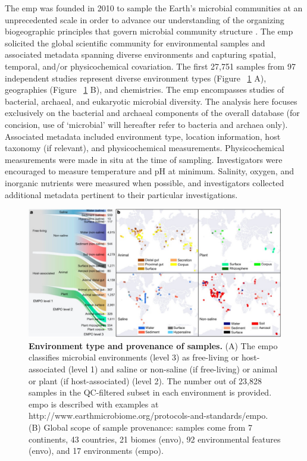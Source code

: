 The \gls{emp} was founded in 2010 to sample the Earth's microbial communities at an
unprecedented scale in order to advance our understanding of the organizing
biogeographic principles that govern microbial community structure
\cite{Gilbert2010, Gilbert2014}. The \gls{emp} solicited the global scientific
community for environmental samples and associated metadata spanning diverse
environments and capturing spatial, temporal, and/or physicochemical covariation.
The first 27,751 samples from 97 independent studies represent diverse environment
types (Figure ~\ref{EMProvenance} A), geographies (Figure ~\ref{EMProvenance} B),
and chemistries. The \gls{emp} encompasses studies of bacterial, archaeal, and
eukaryotic microbial diversity. The analysis here focuses exclusively on the
bacterial and archaeal components of the overall database (for concision, use of
‘microbial’ will hereafter refer to bacteria and archaea only). Associated metadata
included environment type, location information, host taxonomy (if relevant), and
physicochemical measurements. Physicochemical measurements were made in situ at
the time of sampling. Investigators were encouraged to measure temperature and
pH at minimum. Salinity, oxygen, and inorganic nutrients were measured when possible,
and investigators collected additional metadata pertinent to their particular investigations.

\begin{figure}[htbp]
\includegraphics[width=\columnwidth]{chapter_contributions_figures/EMProvenance.pdf}
\caption[Environment type and provenance of samples]{\textbf{Environment type and provenance of samples.}
(A) The \gls{empo} classifies microbial environments (level 3) as free-living or
host-associated (level 1) and saline or non-saline (if free-living) or animal
or plant (if host-associated) (level 2). The number out of 23,828 samples in the
QC-filtered subset in each environment is provided. \gls{empo} is described with examples
at http://www.earthmicrobiome.org/protocols-and-standards/empo. (B) Global scope of
sample provenance: samples come from 7 continents, 43 countries, 21 biomes (\gls{envo}),
92 environmental features (\gls{envo}), and 17 environments (\gls{empo}).}
\label{EMProvenance}
\end{figure}

